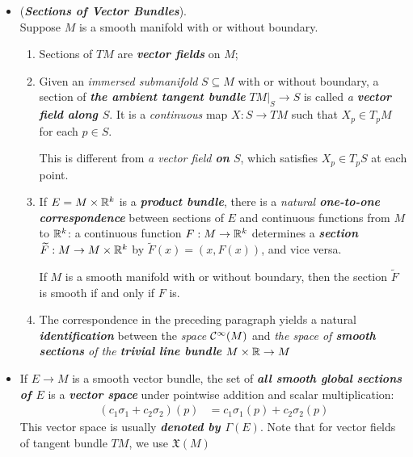 \documentclass[11pt]{article}
\begin{document}
\begin{itemize}
\item \begin{example} (\emph{\textbf{Sections of Vector Bundles}}). \\
Suppose $M$ is a smooth manifold with or without boundary.
\begin{enumerate}
\item Sections of $TM$ are \emph{\textbf{vector fields}} on $M$;
\item Given an \emph{immersed submanifold} $S \subseteq M$ with or without boundary, a section of \emph{\textbf{the ambient tangent bundle}} $TM|_{S} \rightarrow S$ is called \emph{a \textbf{vector field along $S$}}. It is a \emph{continuous} map $X: S \rightarrow TM$ such that $X_p \in T_{p}M$ for each $p \in S$. 

This is different from \emph{a vector field \textbf{on} $S$}, which satisfies $X_p \in T_{p}S$ at each point.
\item If $E = M \times {\mathbb R}^k$ is a \emph{\textbf{product bundle}}, there is a \textit{natural \textbf{one-to-one correspondence}} between sections of $E$ and continuous functions from $M$ to ${\mathbb R}^k$: a continuous function $F: M \rightarrow {\mathbb R}^k$ determines a \emph{\textbf{section}} $\widetilde{F}: M \rightarrow M \times {\mathbb R}^k$ by $\widetilde{F}(x) = (x, F(x))$, and vice versa. 

If $M$ is a smooth manifold with or without boundary, then the section $\widetilde{F}$ is smooth if and only if $F$ is.
\item  The correspondence in the preceding paragraph yields a natural \textbf{\emph{identification}} between the \emph{space} ${\mathcal C}^{\infty}(M)$ and \emph{the space of \textbf{smooth sections} of the \textbf{trivial line bundle}} $M \times {\mathbb R} \rightarrow M$
\end{enumerate}
\end{example}

\item \begin{definition}
If $E \rightarrow M$ is a smooth vector bundle, the set of \emph{\textbf{all smooth global sections of $E$}} is a \emph{\textbf{vector space}} under pointwise addition and scalar multiplication:
\begin{align*}
(c_1 \sigma_1 + c_2 \sigma_2)(p) &= c_1 \sigma_1(p) + c_2 \sigma_2(p)
\end{align*} This vector space is usually \textbf{\emph{denoted by $\Gamma(E)$}}.  Note that for vector fields of tangent bundle $TM$, we use $\mathfrak{X}(M)$
\end{definition}


\end{itemize}
\end{document}
